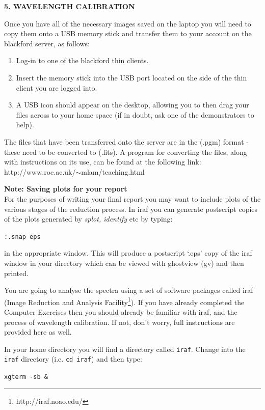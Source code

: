 \documentclass[12pt]{article}
\begin{document}
{\bf 5. WAVELENGTH CALIBRATION}

\noindent
Once you have all of the necessary images saved on the laptop you will need to copy them onto a USB memory stick and transfer them to your account on the blackford server, as follows:

\begin{enumerate}
\item Log-in to one of the blackford thin clients.

\item Insert the memory stick into the USB port located on the side of the thin client you are logged into.

\item A USB icon should appear on the desktop, allowing you to then drag your files across to your home space (if in doubt, ask one of the demonstrators to help).\\
\end{enumerate}

The files that have been transferred onto the server are in the (.pgm) format - these need to be converted to (.fits).  A program for converting the files, along with instructions on its use, can be found at the following link: http://www.roe.ac.uk/$\sim$mlam/teaching.html

{\large {\bf Note: Saving plots for your report}}\\
For the purposes of writing your final report you may want to include plots of the various stages of the reduction process. In {\sc iraf} you can generate postscript copies of the plots generated by {\it splot, identify} etc by typing: 

{\tt :.snap eps}

in the appropriate window. This will produce a postscript `.eps' copy of the {\sc iraf} window in your directory which can be viewed with ghostview (gv) and then printed.

You are going to analyse the spectra using a set of software packages called {\sc iraf} (Image Reduction and Analysis Facility\footnote{http://iraf.noao.edu/}). If you have already completed the Computer Exercises then you should already be familiar with {\sc iraf}, and the process of wavelength calibration. If not, don't worry, full instructions are provided here as well.

In your home directory you will find a directory called {\tt iraf}. Change into the {\tt iraf} directory (i.e. {\tt cd iraf}) and then type:

{\tt \verb,xgterm -sb &,}
\end{document}
